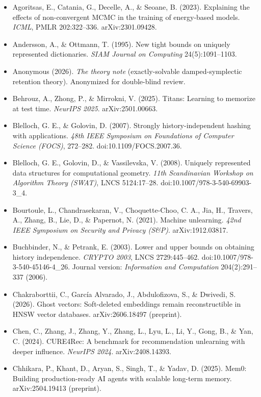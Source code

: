 \documentclass{article}
\begin{document}
\begin{itemize}
\item Agoritsas, E., Catania, G., Decelle, A., \& Seoane, B. (2023). Explaining the effects of non-convergent MCMC in the training of energy-based models. \emph{ICML}, PMLR 202:322--336. arXiv:2301.09428.
\item Andersson, A., \& Ottmann, T. (1995). New tight bounds on uniquely represented dictionaries. \emph{SIAM Journal on Computing} 24(5):1091--1103.
\item Anonymous (2026). \emph{The theory note} (exactly-solvable damped-symplectic retention theory). Anonymized for double-blind review.
\item Behrouz, A., Zhong, P., \& Mirrokni, V. (2025). Titans: Learning to memorize at test time. \emph{NeurIPS 2025}. arXiv:2501.00663.
\item Blelloch, G. E., \& Golovin, D. (2007). Strongly history-independent hashing with applications. \emph{48th IEEE Symposium on Foundations of Computer Science (FOCS)}, 272--282. doi:10.1109/FOCS.2007.36.
\item Blelloch, G. E., Golovin, D., \& Vassilevska, V. (2008). Uniquely represented data structures for computational geometry. \emph{11th Scandinavian Workshop on Algorithm Theory (SWAT)}, LNCS 5124:17--28. doi:10.1007/978-3-540-69903-3\_4.
\item Bourtoule, L., Chandrasekaran, V., Choquette-Choo, C. A., Jia, H., Travers, A., Zhang, B., Lie, D., \& Papernot, N. (2021). Machine unlearning. \emph{42nd IEEE Symposium on Security and Privacy (S\&P)}. arXiv:1912.03817.
\item Buchbinder, N., \& Petrank, E. (2003). Lower and upper bounds on obtaining history independence. \emph{CRYPTO 2003}, LNCS 2729:445--462. doi:10.1007/978-3-540-45146-4\_26. Journal version: \emph{Information and Computation} 204(2):291--337 (2006).
\item Chakraborttii, C., Garc\'ia Alvarado, J., Abdulofizova, S., \& Dwivedi, S. (2026). Ghost vectors: Soft-deleted embeddings remain reconstructible in HNSW vector databases. arXiv:2606.18497 (preprint).
\item Chen, C., Zhang, J., Zhang, Y., Zhang, L., Lyu, L., Li, Y., Gong, B., \& Yan, C. (2024). CURE4Rec: A benchmark for recommendation unlearning with deeper influence. \emph{NeurIPS 2024}. arXiv:2408.14393.
\item Chhikara, P., Khant, D., Aryan, S., Singh, T., \& Yadav, D. (2025). Mem0: Building production-ready AI agents with scalable long-term memory. arXiv:2504.19413 (preprint).

\end{itemize}
\end{document}
